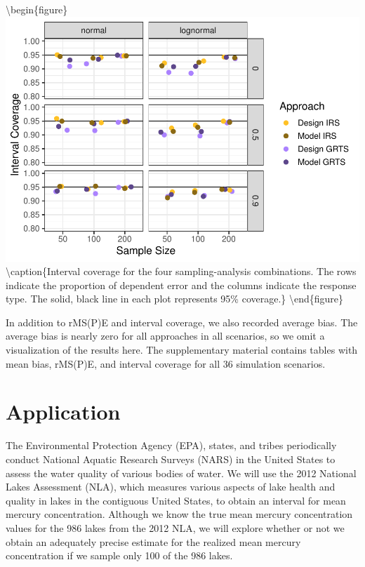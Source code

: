 \documentclass[]{elsarticle} %
\begin{document}
\textbackslash begin\{figure\}
\includegraphics[width=1\linewidth]{manuscript_files/figure-latex/figconf-1}
\textbackslash caption\{Interval coverage for the four sampling-analysis
combinations. The rows indicate the proportion of dependent error and
the columns indicate the response type. The solid, black line in each
plot represents 95\% coverage.\}\label{fig:figconf}
\textbackslash end\{figure\}

In addition to rMS(P)E and interval coverage, we also recorded average
bias. The average bias is nearly zero for all approaches in all
scenarios, so we omit a visualization of the results here. The
supplementary material contains tables with mean bias, rMS(P)E, and
interval coverage for all 36 simulation scenarios.

\hypertarget{application}{%
\section{Application}\label{application}}

The Environmental Protection Agency (EPA), states, and tribes
periodically conduct National Aquatic Research Surveys (NARS) in the
United States to assess the water quality of various bodies of water. We
will use the 2012 National Lakes Assessment (NLA), which measures
various aspects of lake health and quality in lakes in the contiguous
United States, to obtain an interval for mean mercury concentration.
Although we know the true mean mercury concentration values for the 986
lakes from the 2012 NLA, we will explore whether or not we obtain an
adequately precise estimate for the realized mean mercury concentration
if we sample only 100 of the 986 lakes.
\end{document}
